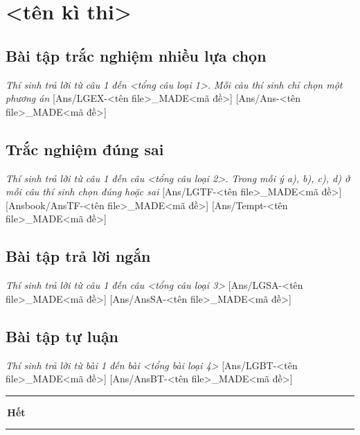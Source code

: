 \documentclass[Main.tex]{subfiles}
\gdef\made{<mã đề ngẫu nhiên>}  %
\begin{document}
\section[<tên kì thi> <môn thi> - Mã đề \made]{<tên kì thi>} %

\subsection{Bài tập trắc nghiệm nhiều lựa chọn}\textit{\large Thí sinh trả lời từ câu 1 đến <tổng câu loại 1>. Mỗi câu thí sinh chỉ chọn một phương án}
[Ans/LGEX-<tên file>_MADE<mã đề>]
[Ans/Ans-<tên file>_MADE<mã đề>]

\subsection{Trắc nghiệm đúng sai}\textit{\large Thí sinh trả lời từ câu 1 đến câu <tổng câu loại 2>. Trong mỗi ý a), b), c), d) ở mỗi câu thí sinh chọn đúng hoặc sai}
[Ans/LGTF-<tên file>_MADE<mã đề>]
[Ansbook/AnsTF-<tên file>_MADE<mã đề>]
[Ans/Tempt-<tên file>_MADE<mã đề>]
\setcounter{ex}{0}

\subsection{Bài tập trả lời ngắn}\textit{\large Thí sinh trả lời từ câu 1 đến câu <tổng câu loại 3>}
[Ans/LGSA-<tên file>_MADE<mã đề>]
[Ans/AnsSA-<tên file>_MADE<mã đề>]
\setcounter{ex}{0}

\subsection{Bài tập tự luận}\textit{\large Thí sinh trả lời từ bài 1 đến bài <tổng bài loại 4>}
[Ans/LGBT-<tên file>_MADE<mã đề>]
[Ans/AnsBT-<tên file>_MADE<mã đề>]

\begin{center}
 \rule[4pt]{2cm}{1pt}\,\large\bfseries Hết\,\rule[4pt]{2cm}{1pt}
\end{center}
\label{x}
\end{document}

